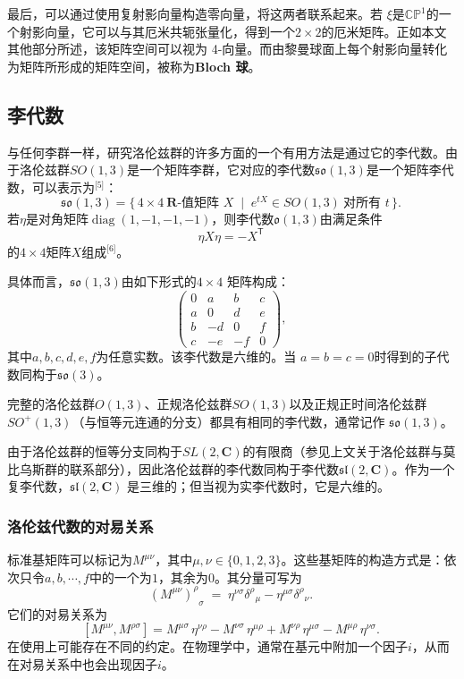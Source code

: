 最后，可以通过使用复射影向量构造零向量，将这两者联系起来。若 $\xi$是$\mathbb{CP}^{1}$的一个射影向量，它可以与其厄米共轭张量化，得到一个$2 \times 2$的厄米矩阵。正如本文其他部分所述，该矩阵空间可以视为 4-向量。而由黎曼球面上每个射影向量转化为矩阵所形成的矩阵空间，被称为\textbf{Bloch 球}。
\subsection{李代数}
与任何李群一样，研究洛伦兹群的许多方面的一个有用方法是通过它的李代数。由于洛伦兹群$SO(1,3)$是一个矩阵李群，它对应的李代数$\mathfrak{so}(1,3)$是一个矩阵李代数，可以表示为\(^\text{[5]}\)：
\[
\mathfrak{so}(1,3) = \{\, 4\times 4 \ \mathbf{R}\text{-值矩阵 } X \;\mid\; e^{tX} \in SO(1,3) \ \text{对所有 } t \,\}.~
\]
若$\eta$是对角矩阵$\operatorname{diag}(1,-1,-1,-1)$，则李代数$\mathfrak{o}(1,3)$由满足条件
\[
\eta X \eta = -X^{\textsf{T}}~
\]
的$4 \times 4$矩阵$X$组成\(^\text{[6]}\)。

具体而言，$\mathfrak{so}(1,3)$由如下形式的$4\times 4$ 矩阵构成：
\[
\begin{pmatrix}
0 & a & b & c \\
a & 0 & d & e \\
b & -d & 0 & f \\
c & -e & -f & 0
\end{pmatrix},~
\]
其中$a,b,c,d,e,f$为任意实数。该李代数是六维的。当 $a=b=c=0$时得到的子代数同构于$\mathfrak{so}(3)$。

完整的洛伦兹群$O(1,3)$、正规洛伦兹群$SO(1,3)$以及正规正时间洛伦兹群$SO^{+}(1,3)$（与恒等元连通的分支）都具有相同的李代数，通常记作 $\mathfrak{so}(1,3)$。

由于洛伦兹群的恒等分支同构于$SL(2,\mathbf{C})$的有限商（参见上文关于洛伦兹群与莫比乌斯群的联系部分），因此洛伦兹群的李代数同构于李代数$\mathfrak{sl}(2,\mathbf{C})$。作为一个复李代数，$\mathfrak{sl}(2,\mathbf{C})$ 是三维的；但当视为实李代数时，它是六维的。
\subsubsection{洛伦兹代数的对易关系}
标准基矩阵可以标记为$M^{\mu \nu}$，其中$\mu,\nu \in \{0,1,2,3\}$。这些基矩阵的构造方式是：依次只令$a,b,\cdots,f$中的一个为$1$，其余为$0$。其分量可写为
\[
{(M^{\mu \nu})^{\rho}}_{\sigma} \;=\; \eta^{\nu \sigma} {\delta^{\rho}}_{\mu} - \eta^{\mu \sigma} {\delta^{\rho}}_{\nu}.~
\]
它们的对易关系为
\[
[M^{\mu \nu}, M^{\rho \sigma}] 
= M^{\mu \sigma}\,\eta^{\nu \rho} 
- M^{\nu \sigma}\,\eta^{\mu \rho} 
+ M^{\nu \rho}\,\eta^{\mu \sigma} 
- M^{\mu \rho}\,\eta^{\nu \sigma}.~
\]
在使用上可能存在不同的约定。在物理学中，通常在基元中附加一个因子$i$，从而在对易关系中也会出现因子$i$。

